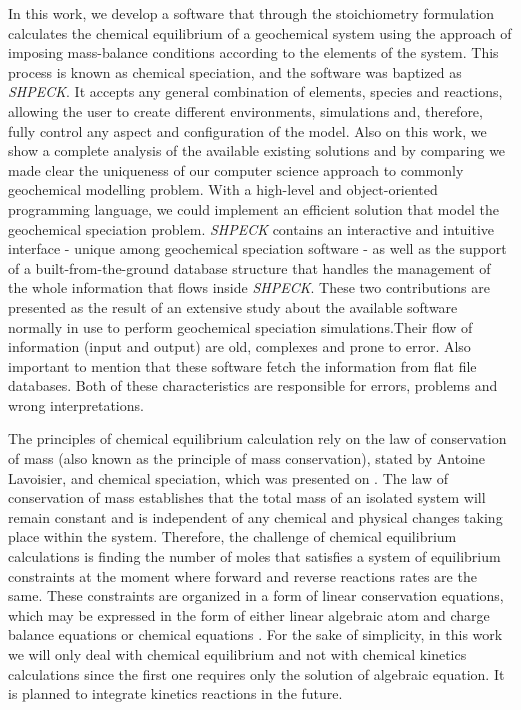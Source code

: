 \documentclass[ppgc,mestrado,english]{iiufrgs}
\begin{document}

In this work, we develop a software that through the stoichiometry formulation calculates the chemical equilibrium of a geochemical system using the approach of imposing mass-balance conditions according to the elements of the system. This process is known as chemical speciation, and the software was baptized as \emph{SHPECK}. It accepts any general combination of elements, species and reactions, allowing the user to create different environments, simulations and, therefore, fully control any aspect and configuration of the model. Also on this work, we show a complete analysis of the available existing solutions and by comparing we made clear the uniqueness of our computer science approach to commonly geochemical modelling problem. With a high-level and object-oriented programming language, we could implement an efficient solution that model the geochemical speciation problem. \emph{SHPECK} contains an interactive and intuitive interface - unique among geochemical speciation software - as well as the support of a built-from-the-ground database structure that handles the management of the whole information that flows inside \emph{SHPECK}. These two contributions are presented as the result of an extensive study about the available software normally in use to perform geochemical speciation simulations.Their flow of information (input and output) are old, complexes and prone to error. Also important to mention that these software fetch the information from flat file databases. Both of these characteristics are responsible for errors, problems and wrong interpretations.


The principles of chemical equilibrium calculation rely on the law of conservation of mass (also known as the principle of mass conservation), stated by Antoine Lavoisier, and chemical speciation, which was presented on \cite{Garrels:65}. The law of conservation of mass establishes that the total mass of an isolated system will remain constant and is independent of any chemical and physical changes taking place within the system. Therefore, the challenge of chemical equilibrium calculations is finding the number of moles that satisfies a system of equilibrium constraints at the moment where forward and reverse reactions rates are the same. These constraints are organized in a form of linear conservation equations, which may be expressed in the form of either linear algebraic atom and charge balance equations or chemical equations \cite{SmithMissen83}. For the sake of simplicity, in this work we will only deal with chemical equilibrium and not with chemical kinetics calculations since the first one requires only the solution of algebraic equation. It is planned to integrate kinetics reactions in the future.
\end{document}
